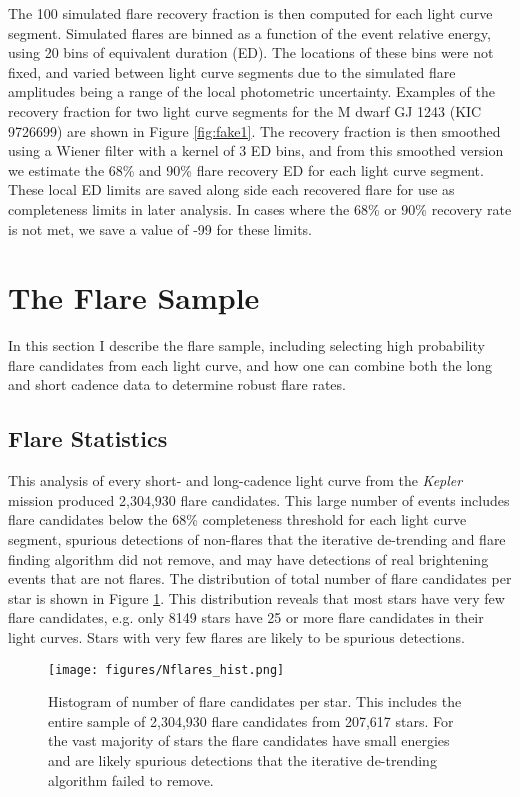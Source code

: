 \documentclass[twocolumn]{aastex6}
\newcommand{\Kepler}{\textsl{Kepler}\xspace}
\begin{document}
The 100 simulated flare recovery fraction is then computed for each light curve segment. Simulated flares are binned as a function of the event relative energy, using 20 bins of equivalent duration (ED). The locations of these bins were not fixed, and varied between light curve segments due to the simulated flare amplitudes being a range of the local photometric uncertainty. Examples of the recovery fraction for two light curve segments for the M dwarf GJ 1243 (KIC 9726699) are shown in Figure \ref{fig:fake1}. The recovery fraction is then smoothed using a Wiener filter with a kernel of 3 ED bins, and from this smoothed version we estimate the 68\% and 90\% flare recovery ED for each light curve segment. These local ED limits are saved along side each recovered flare for use as completeness limits in later analysis. In cases where the 68\% or 90\% recovery rate is not met, we save a value of -99 for these limits.





\section{The Flare Sample}
In this section I describe the flare sample, including selecting high probability flare candidates from each light curve, and how one can combine both the long and short cadence data to determine robust flare rates.


\subsection{Flare Statistics}


This analysis of every short- and long-cadence light curve from the \Kepler mission produced 2,304,930 flare candidates. This large number of events includes flare candidates below the 68\% completeness threshold for each light curve segment, spurious detections of non-flares that the iterative de-trending and flare finding algorithm did not remove, and may have detections of real brightening events that are not flares. The distribution of total number of flare candidates per star is shown in Figure \ref{fig:flarehist}. This distribution reveals that most stars have very few flare candidates, e.g. only 8149 stars have 25 or more flare candidates in their light curves. Stars with very few flares are likely to be spurious detections.

\begin{figure}[!t]
\centering
\texttt{[image: figures/Nflares\_hist.png]}
\caption{
Histogram of number of flare candidates per star. This includes the entire sample of 2,304,930 flare candidates from 207,617 stars. For the vast majority of stars the flare candidates have small energies and are likely spurious detections that the iterative de-trending algorithm failed to remove.
}
\label{fig:flarehist}
\end{figure}
\end{document}
